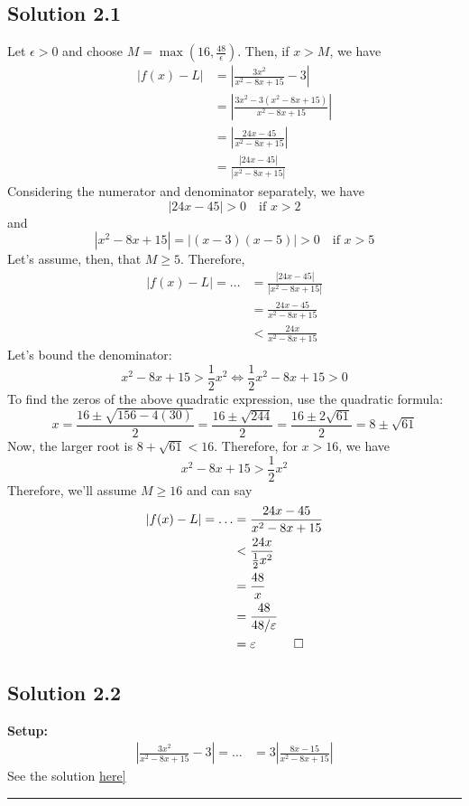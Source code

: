 \documentclass{article}
\begin{document}
\subsection*{Solution 2.1}
Let $\epsilon > 0$ and choose $M = \max\left(16,\frac{48}{\epsilon}\right)$. Then, if $x > M$, we have 
\begin{align*}
    \left| f(x) - L \right|
    &=\left| \frac{3x^2}{x^2-8x+15} - 3 \right| \\
    &= \left| \frac{3x^2 - 3(x^2-8x+15)}{x^2-8x+15} \right| \\
    &= \left| \frac{24x - 45}{x^2-8x+15} \right| \\
    &= \frac{ \left|24x-45\right| }{ \left|x^2-8x+15\right| }
\end{align*}
Considering the numerator and denominator separately, we have
\[
    \left|24x-45\right| > 0 \quad \text{if }x > 2
\]
and
\[
    \left|x^2-8x+15\right| = \left|(x-3)(x-5)\right| > 0\quad \text{if } x > 5
\]
Let's assume, then, that $M \geq 5$. Therefore,
\begin{align*}
    \left|f(x)-L\right| = \ldots &= \frac{ \left|24x-45\right| }{ \left|x^2-8x+15\right| } \\
    &= \frac{24x-45}{x^2-8x+15} \\
    &< \frac{24x}{x^2-8x+15}
\end{align*}
Let's bound the denominator:
\[
    x^2-8x+15 > \frac{1}{2}x^2 \iff \frac{1}{2}x^2 - 8x + 15 > 0
\]
To find the zeros of the above quadratic expression, use the quadratic formula:
\[
    x = \frac{16 \pm \sqrt{156 - 4(30)}}{2} = \frac{16\pm \sqrt{244}}{2} = \frac{16 \pm 2\sqrt{61}}{2} = 8\pm \sqrt{61}
\]
Now, the larger root is $8 + \sqrt{61} < 16$. Therefore, for $x > 16$, we have
\[
    x^2-8x+15 > \frac{1}{2}x^2
\]
Therefore, we'll assume $M \geq 16$ and can say
\begin{align*}
    \left|f(x)-L\right| = \ldots &= \frac{24x-45}{x^2-8x+15} \\
    &< \frac{24x}{\frac{1}{2}x^2} \\ 
    &= \frac{48}{x} \\
    &= \frac{48}{48/\epsilon} \\
    &= \epsilon \quad \qed
\end{align*}
\subsection*{Solution 2.2}
\textbf{Setup: } 
\begin{align*}
    \left|\frac{3x^2}{x^2-8x+15} - 3 \right| = \ldots &=3\left|\frac{8x-15}{x^2-8x+15} \right|
\end{align*}
See the solution \href{https://drive.google.com/file/d/1Jr-4IQba3sL3lEX3WXa2Sx_bBObRx9gC/view?usp=drive_link}{here]}

\begin{center} \rule{15cm}{1mm} \end{center}
\end{document}
